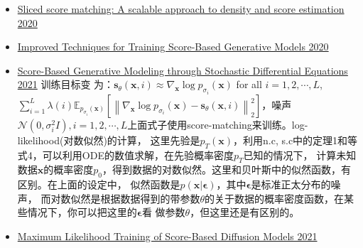 \documentclass[lang=cn,newtx,10pt,scheme=chinese]{elegantbook}
\begin{document}
\begin{itemize}
  \item \href{c.c}{Sliced score matching: A scalable approach to density and score estimation 2020}
  \item \href{c}{Improved Techniques for Training Score-Based Generative Models 2020}
  \item \href{c}{Score-Based Generative Modeling through Stochastic Differential Equations 2021} 训练目标变
  为：$\mathbf{s}_\theta(\mathbf{x}, i) \approx \nabla_{\mathbf{x}} \log p_{\sigma_i}(\mathbf{x})$ 
  for all $i=1,2, \cdots, L$, $\sum_{i=1}^L \lambda(i) \mathbb{E}_{p_{\sigma_i}(\mathbf{x})}
  \left[\left\|\nabla_{\mathbf{x}} \log p_{\sigma_i}(\mathbf{x})-\mathbf{s}_\theta(\mathbf{x}, i)
  \right\|_2^2\right]$，噪声$\mathcal{N}\left(0, \sigma_i^2 I\right), i=1,2, \cdots, L
  $上面式子使用score-matching来训练。log-likelihood(对数似然)的计算，
  这里先验是$p_T(\mathbf{x})$，利用n.c, s.c中的定理1和等式4，可以利用ODE的数值求解，在先验概率密度$p_T$已知的情况下，
  计算未知数据$\mathbf{x}$的概率密度$p_0$，得到数据的对数似然。这里和贝叶斯中的似然函数，有区别。在上面的设定中，
  似然函数是$p(\mathbf{x}|\mathbf{\epsilon})$，其中$\mathbf{\epsilon}$是标准正太分布的噪声，
  而对数似然是根据数据得到的带参数$\theta$的关于数据的概率密度函数，在某些情况下，你可以把这里的$\mathbf{\epsilon}$看
  做参数$\theta$，但这里还是有区别的。
  \item \href{c.c}{Maximum Likelihood Training of Score-Based Diffusion Models 2021}
  

\end{itemize}
\end{document}
